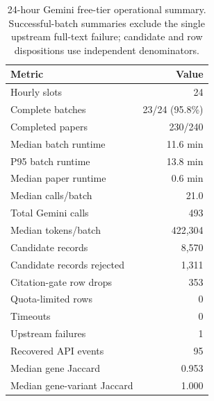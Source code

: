\begin{table}[!ht]
\centering
\caption{24-hour Gemini free-tier operational summary. Successful-batch summaries exclude the single upstream full-text failure; candidate and row dispositions use independent denominators.}
\label{tab:gemini-free-tier-summary}
\scriptsize
\setlength{\tabcolsep}{4pt}
\begin{tabular}{@{}lr@{}}
\toprule
\textbf{Metric} & \textbf{Value} \\
\midrule
Hourly slots & 24 \\
Complete batches & 23/24 (95.8\%) \\
Completed papers & 230/240 \\
Median batch runtime & 11.6 min \\
P95 batch runtime & 13.8 min \\
Median paper runtime & 0.6 min \\
Median calls/batch & 21.0 \\
Total Gemini calls & 493 \\
Median tokens/batch & 422,304 \\
Candidate records & 8,570 \\
Candidate records rejected & 1,311 \\
Citation-gate row drops & 353 \\
Quota-limited rows & 0 \\
Timeouts & 0 \\
Upstream failures & 1 \\
Recovered API events & 95 \\
Median gene Jaccard & 0.953 \\
Median gene-variant Jaccard & 1.000 \\
\bottomrule
\end{tabular}
\end{table}
